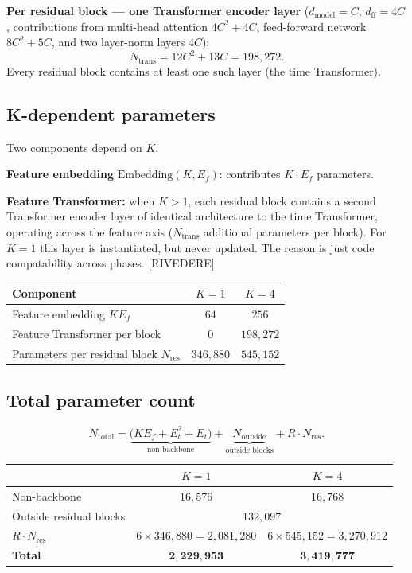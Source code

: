 \textbf{Per residual block — one Transformer encoder layer}
($d_{\mathrm{model}}=C$, $d_{\mathrm{ff}}=4C$, contributions from
multi-head attention $4C^2+4C$, feed-forward network $8C^2+5C$, and
two layer-norm layers $4C$):
\[
N_{\mathrm{trans}}
= 12C^2 + 13C
= 198{,}272.
\]
Every residual block contains at least one such layer (the time Transformer).

\subsection{K-dependent parameters}

Two components depend on $K$.

\textbf{Feature embedding} $\mathrm{Embedding}(K,E_f)$: contributes
$K\cdot E_f$ parameters.

\textbf{Feature Transformer:} when $K>1$, each residual block contains a
second Transformer encoder layer of identical architecture to the time
Transformer, operating across the feature axis ($N_{\mathrm{trans}}$
additional parameters per block). For $K=1$ this layer is instantiated, but never updated. The reason is just code compatability across phases. [RIVEDERE]

\begin{table}[h]
\centering
\begin{tabular}{lcc}
\toprule
Component & $K=1$ & $K=4$ \\
\midrule
Feature embedding $K E_f$ & $64$ & $256$ \\
Feature Transformer per block & $0$ & $198{,}272$ \\
\midrule
Parameters per residual block $N_{\mathrm{res}}$ & $346{,}880$ & $545{,}152$ \\
\bottomrule
\end{tabular}
\end{table}

\subsection{Total parameter count}

\[
N_{\mathrm{total}}
= \underbrace{\bigl(K E_f + E_t^2 + E_t\bigr)}_{\text{non-backbone}}
+ \underbrace{N_{\mathrm{outside}}}_{\text{outside blocks}}
+ R\cdot N_{\mathrm{res}}.
\]

\begin{table}[h]
\centering
\begin{tabular}{lcc}
\toprule
 & $K=1$ & $K=4$ \\
\midrule
Non-backbone & $16{,}576$ & $16{,}768$ \\
Outside residual blocks & \multicolumn{2}{c}{$132{,}097$} \\
$R \cdot N_{\mathrm{res}}$ & $6\times 346{,}880 = 2{,}081{,}280$ & $6\times 545{,}152 = 3{,}270{,}912$ \\
\midrule
\textbf{Total} & $\mathbf{2{,}229{,}953}$ & $\mathbf{3{,}419{,}777}$ \\
\bottomrule
\end{tabular}
\end{table}

